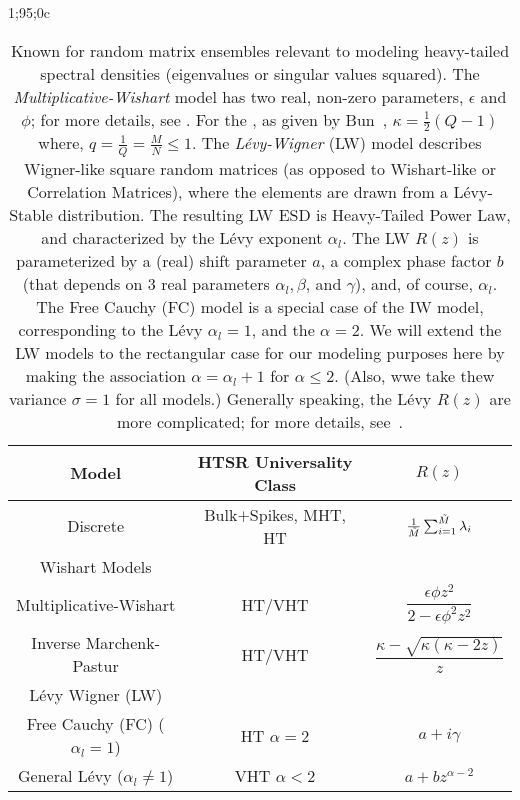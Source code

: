 1;95;0c%
\begin{table}[h!]
  \centering
  \renewcommand{\arraystretch}{1.25} %
\begin{tabular}{|c|c|c|}
  \hline
  Model & \textbf{HTSR Universality Class} & \textbf{$R(z)$}\\  \hline
  \hline
  Discrete & Bulk$+$Spikes, MHT, HT & $\tfrac{1}{\tilde{M}}\sum_{i=1}^{\tilde{M}}\lambda_{i}$   \\ \hline
  \hline
  Wishart Models & &\\ \hline
  Multiplicative-Wishart & HT/VHT& $\dfrac{\epsilon\phi z^2}{2 - \epsilon\phi^2 z^2}$ \\  \hline
  Inverse Marchenk-Pastur & HT/VHT &  $\dfrac{\kappa-\sqrt{\kappa(\kappa-2z)}}{z}$   \\  \hline
  \hline
  L\'evy Wigner (LW) &   & \\  \hline
  Free Cauchy (FC) ($\alpha_{l}=1$) & HT $\alpha=2$ & $a+i\gamma$ \\ \hline
  General L\'evy  ($\alpha_{l}\ne 1$) & VHT $\alpha<2$   & $a+bz^{\alpha-2}$ \\  \hline
\end{tabular}
  \caption{Known \RTransforms for random matrix ensembles relevant to modeling heavy-tailed spectral densities (eigenvalues or singular values squared).
    The \emph{Multiplicative-Wishart} model has two real, non-zero parameters, $\epsilon$ and $\phi$; for more details,
    see \cite{PW16_NIPS}.
  For the \emph{\InverseMP}, as given by Bun~\cite{BunThesis}, $\kappa=\frac{1}{2}(Q-1)$ where, $q=\frac{1}{Q}=\frac{M}{N}\le 1$.
  The \emph{L\'evy-Wigner} (LW) model describes Wigner-like square random matrices
  (as opposed to Wishart-like or Correlation Matrices), where the elements are drawn from a L\'evy-Stable distribution.
  The resulting LW ESD is Heavy-Tailed Power Law, and characterized by the L\'evy exponent $\alpha_{l}$.
  The LW $R(z)$ is parameterized by a (real) shift parameter $a$,
  a complex phase factor $b$ (that depends on 3 real parameters   $\alpha_{l}, \beta$, and $\gamma$),
  and, of course, $\alpha_{l}$.
  The Free Cauchy (FC) model is a special case of the IW model, corresponding to the L\'evy $\alpha_{l}=1$, and the \HTSR $\alpha=2$. 
  We will extend the LW models to the rectangular case for our modeling purposes here by making
  the association   $\alpha = \alpha_{l}+1$ for $\alpha\le 2$.
   (Also, wwe take thew variance $\sigma=1$ for all models.)
   Generally speaking, the L\'evy $R(z)$ are more complicated; 
   for more details, see~\cite{BJNx01_TR,BJNx06_TR,BJ09_TR}.
}
\label{tab:known_r_transforms}
\end{table}

